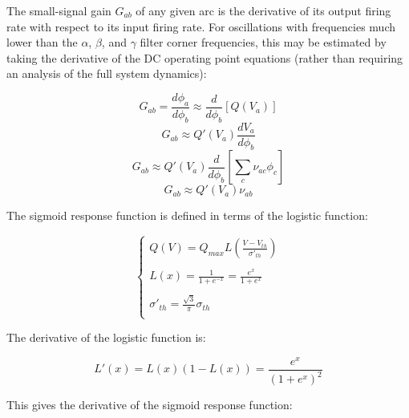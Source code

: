 The small-signal gain $G_{ab}$ of any given arc is the derivative of its
output firing rate with respect to its input firing rate. For oscillations
with frequencies much lower than the $\alpha$, $\beta$, and $\gamma$ filter
corner frequencies, this may be estimated by taking the derivative of the
DC operating point equations (rather than requiring an analysis of the full
system dynamics):

\begin{equation}
G_{ab} = \frac{d\phi_a}{d\phi_b}
\approx \frac{d}{d\phi_b} \left [ Q(V_a) \right ]
\end{equation}
%
\begin{equation}
G_{ab} \approx Q'(V_a) \frac{dV_a}{d\phi_b}
\end{equation}
%
\begin{equation}
G_{ab} \approx
Q'(V_a) \frac{d}{d\phi_b} \left [ \sum_c \nu_{ac} \phi_c \right ]
\end{equation}
%
\begin{equation}
G_{ab} \approx Q'(V_a) \nu_{ab}
\label{eq-robinson-gain-qprime}
\end{equation}

The sigmoid response function is defined in terms of the logistic function:

\begin{equation}
\left \{
\begin{array}{l}
Q(V) = Q_{max} L \left (\frac{V - V_{th}}{\sigma'_{th}} \right ) \\
\\
L(x) = \frac{1}{1 + e^{-x}} = \frac{e^x}{1 + e^x} \\
\\
\sigma'_{th} = \frac{\sqrt{3}}{\pi}\sigma_{th} \\
\end{array}
\right .
\label{eq-robinson-sigmoid-logistic}
\end{equation}

The derivative of the logistic function is:

\begin{equation}
L'(x) = L(x) \left ( 1 - L(x) \right ) = \frac{e^x}{(1 + e^x)^2}
\label{eq-robinson-logistic-derivative}
\end{equation}

This gives the derivative of the sigmoid response function:

